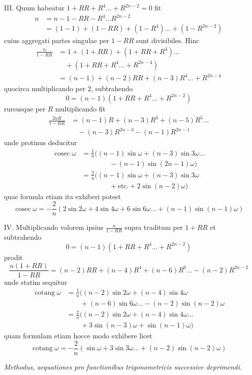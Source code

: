 III. Quum habeatur \(1+RR+R^4\ldots+R^{2n-2}=0\) fit \[\begin{aligned}n&=n-1-RR-R^4\ldots R^{2n-2}\\&=(1-1)+(1-RR)+(1-R^4)\ldots+(1-R^{2n-2})\end{aligned}\] cuius aggregati partes singulae per \(1-RR\) sunt divisibiles. Hinc \[\begin{aligned}\frac n{1-RR}&=1+(1+RR)+(1+RR+R^4)\ldots\\&\quad+(1+RR+R^4\ldots+R^{2n-4})\\&=(n-1)+(n-2)RR+(n-3)R^4\ldots+R^{2n-4}\end{aligned}\] quocirca multiplicando per \(2\), subtrahendo \[0=(n-1)(1+RR+R^4\ldots+R^{2n-2})\] rursusque per \(R\) multiplicando fit \[\begin{aligned}\frac{2nR}{1-RR}&=(n-1)R+(n-3)R^3+(n-5)R^5\ldots\\&\quad-(n-3)R^{2n-3}-(n-1)R^{2n-1}\end{aligned}\] unde protinus deducitur \[\begin{aligned}\operatorname{cosec}\omega&=\frac1n\bigl((n-1)\sin\omega+(n-3)\sin3\omega\ldots\\&\qquad\qquad-(n-1)\sin(2n-1)\omega\bigr)\\&=\frac2n\bigl((n-1)\sin\omega+(n-3)\sin3\omega\\&\qquad\qquad+\text{etc.}+2\sin(n-2)\omega\bigr)\end{aligned}\] quae formula etiam ita exhiberi potest \[\operatorname{cosec}\omega=-\frac2n(2\sin2\omega+4\sin4\omega+6\sin6\omega\ldots+(n-1)\sin(n-1)\omega)\]

IV. Multiplicando valorem ipsius \(\frac n{1-RR}\) supra traditum per \(1+RR\) et subtrahendo \[0=(n-1)(1+RR+R^4\ldots+R^{2n-2})\] prodit \[\frac{n(1+RR)}{1-RR}=(n-2)RR+(n-4)R^4+(n-6)R^6\ldots-(n-2)R^{2n-2}\]
unde statim sequitur \[\begin{aligned}\operatorname{cotang}\omega&=\frac1n\bigl((n-2)\sin2\omega+(n-4)\sin4\omega\\&\qquad+(n-6)\sin6\omega\ldots-(n-2)\sin(n-2)\omega\\&=\frac2n((n-2)\sin2\omega+(n-4)\sin4\omega\ldots\\&\qquad+3\sin(n-3)\omega+\sin(n-1)\omega)\end{aligned}\] quam formulam etiam hocce modo exhibere licet \[\operatorname{cotang}\omega=-\frac2n(\sin\omega+3\sin3\omega\ldots+(n-2)\sin(n-2)\omega)\]

\begin{center}\textit{Methodus, aequationes pro functionibus trigonometricis successive deprimendi.}\end{center}


